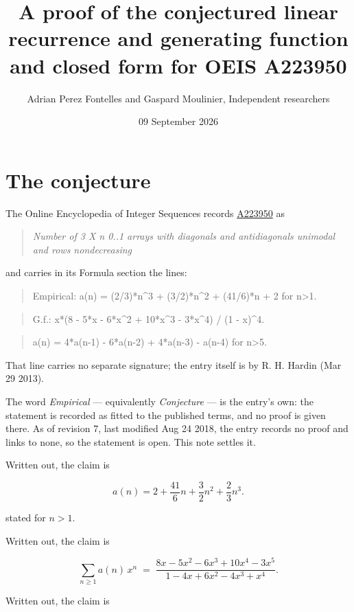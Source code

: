 \documentclass[11pt]{article}
\title{A proof of the conjectured linear recurrence and generating function and closed form for OEIS A223950}
\author{Adrian Perez Fontelles and Gaspard Moulinier, Independent researchers}
\date{09 September 2026}
\theoremstyle{definition}
\begin{document}
\maketitle
\section{The conjecture}

The Online Encyclopedia of Integer Sequences records \href{https://oeis.org/A223950}{A223950} as

\begin{quote}\itshape Number of 3 X n 0..1 arrays with diagonals and antidiagonals unimodal and rows nondecreasing\end{quote}

and carries in its Formula section the lines:

\begin{quote}\ttfamily Empirical: a(n) = (2/3)*n\textasciicircum{}3 + (3/2)*n\textasciicircum{}2 + (41/6)*n + 2 for n>1.\end{quote}

\begin{quote}\ttfamily G.f.: x*(8 - 5*x - 6*x\textasciicircum{}2 + 10*x\textasciicircum{}3 - 3*x\textasciicircum{}4) / (1 - x)\textasciicircum{}4.\end{quote}

\begin{quote}\ttfamily a(n) = 4*a(n-1) - 6*a(n-2) + 4*a(n-3) - a(n-4) for n>5.\end{quote}

That line carries no separate signature; the entry itself is by R. H. Hardin (Mar 29 2013).

The word {\itshape Empirical} --- equivalently {\itshape Conjecture} --- is the entry's own: the statement is recorded as fitted to the published terms, and no proof is given there. As of revision 7, last modified Aug 24 2018, the entry records no proof and links to none, so the statement is open. This note settles it.

Written out, the claim is

\[a(n) = 2 + \frac{41}{6}n + \frac{3}{2}n^{2} + \frac{2}{3}n^{3}.\]

stated for $n > 1$.

Written out, the claim is

\[\sum_{n \ge 1} a(n)\,x^n \;=\; \frac{8x - 5x^{2} - 6x^{3} + 10x^{4} - 3x^{5}}{1 - 4x + 6x^{2} - 4x^{3} + x^{4}}.\]

Written out, the claim is
\end{document}
